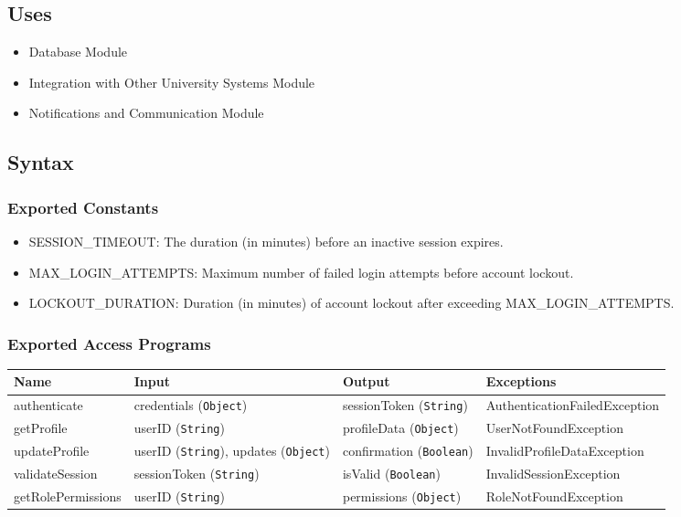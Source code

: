 \documentclass[12pt, titlepage]{article}
\begin{document}
\subsection{Uses}
\begin{itemize}
    \item Database Module
    \item Integration with Other University Systems Module
    \item Notifications and Communication Module
\end{itemize}

\subsection{Syntax}
\subsubsection{Exported Constants}
\begin{itemize}
    \item SESSION\_TIMEOUT: The duration (in minutes) before an inactive session expires.
    \item MAX\_LOGIN\_ATTEMPTS: Maximum number of failed login attempts before account lockout.
    \item LOCKOUT\_DURATION: Duration (in minutes) of account lockout after exceeding MAX\_LOGIN\_ATTEMPTS.
\end{itemize}

\subsubsection{Exported Access Programs}
\begin{center}
    \scriptsize
    \begin{tabular}{|p{3cm}|p{4cm}|p{4cm}|p{4cm}|}
        \hline
        \textbf{Name} & \textbf{Input} & \textbf{Output} & \textbf{Exceptions} \\
        \hline
        authenticate & credentials (\texttt{Object}) & sessionToken (\texttt{String}) & AuthenticationFailedException \\
        \hline
        getProfile & userID (\texttt{String}) & profileData (\texttt{Object}) & UserNotFoundException \\
        \hline
        updateProfile & userID (\texttt{String}), updates (\texttt{Object}) & confirmation (\texttt{Boolean}) & InvalidProfileDataException \\
        \hline
        validateSession & sessionToken (\texttt{String}) & isValid (\texttt{Boolean}) & InvalidSessionException \\
        \hline
        getRolePermissions & userID (\texttt{String}) & permissions (\texttt{Object}) & RoleNotFoundException \\
        \hline
    \end{tabular}
\end{center}
\end{document}
